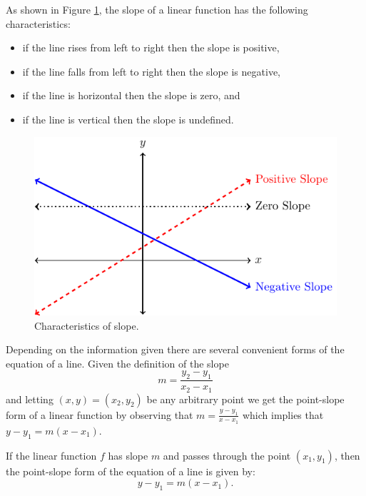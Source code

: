 As shown in Figure \ref{f:0.1slope}, the slope of a linear function has the following characteristics:
\begin{itemize}
    \item if the line rises from left to right then the slope is positive,
    \item if the line falls from left to right then the slope is negative,
    \item if the line is horizontal then the slope is zero, and
    \item if the line is vertical then the slope is undefined.
\end{itemize}
\begin{figure}
    \begin{center}
        \includegraphics[width=0.6\columnwidth]{figures/0-1-fig3.pdf}
    \end{center}
    \caption{Characteristics of slope.}
    \label{f:0.1slope}
\end{figure}

Depending on the information given there are several convenient forms of the equation of a
line.  Given the definition of the slope
\[ m = \frac{y_2 - y_1}{x_2 - x_1} \]
and letting $(x,y) = (x_2,y_2)$ be any arbitrary point we get the point-slope form of a
linear function by observing that $m = \frac{y - y_1}{x - x_1}$ which implies
that $y - y_1 = m(x-x_1)$.
\begin{definition}
If the linear function $f$ has slope $m$ and passes through the
point $(x_1,y_1)$, then the point-slope form of the equation of a line is given by: 
\[ y-y_1=m(x- x_1).  \]
\end{definition}

